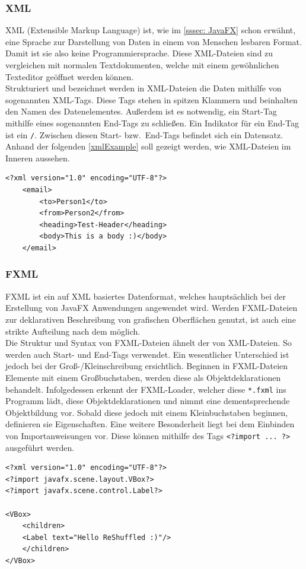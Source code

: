 \subsubsection{XML}
XML (Extensible Markup Language) ist, wie im \autoref{sssec: JavaFX} schon erwähnt, eine Sprache zur Darstellung von Daten in einem von Menschen lesbaren Format.
Damit ist sie also keine Programmiersprache.
Diese XML-Dateien sind zu vergleichen mit normalen Textdokumenten, welche mit einem gewöhnlichen Texteditor geöffnet werden können.\\
Strukturiert und bezeichnet werden in XML-Dateien die Daten mithilfe von sogenannten XML-Tags.
Diese Tags stehen in spitzen Klammern und beinhalten den Namen des Datenelementes.
Außerdem ist es notwendig, ein Start-Tag mithilfe eines sogenannten End-Tags zu schließen.
Ein Indikator für ein End-Tag ist ein \lstinline{/}.
Zwischen diesen Start- bzw.\ End-Tags befindet sich ein Datensatz.\\
Anhand der folgenden \autoref{xmlExample} soll gezeigt werden, wie XML-Dateien im Inneren aussehen.
\begin{lstlisting}[style=XML,caption=XML-Codebeispiel,label=xmlExample]
<?xml version="1.0" encoding="UTF-8"?>
    <email>
        <to>Person1</to>
        <from>Person2</from>
        <heading>Test-Header</heading>
        <body>This is a body :)</body>
    </email>
\end{lstlisting}
\subsubsection{FXML}
FXML ist ein auf XML basiertes Datenformat, welches hauptsächlich bei der Erstellung von JavaFX Anwendungen angewendet wird.
Werden FXML-Dateien zur deklarativen Beschreibung von grafischen Oberflächen genutzt, ist auch eine strikte Aufteilung nach dem  möglich.\\
Die Struktur und Syntax von FXML-Dateien ähnelt der von XML-Dateien.
So werden auch Start- und End-Tags verwendet.
Ein wesentlicher Unterschied ist jedoch bei der Groß-/Kleinschreibung ersichtlich.
Beginnen in FXML-Dateien Elemente mit einem Großbuchstaben, werden diese als Objektdeklarationen behandelt.
Infolgedessen erkennt der FXML-Loader, welcher diese \lstinline{*.fxml} ins Programm lädt, diese Objektdeklarationen und nimmt eine dementsprechende Objektbildung vor.
Sobald diese jedoch mit einem Kleinbuchstaben beginnen, definieren sie Eigenschaften.
Eine weitere Besonderheit liegt bei dem Einbinden von Importanweisungen vor.
Diese können mithilfe des Tags \lstinline{<?import ... ?>} ausgeführt werden.
\begin{lstlisting}[style=XML,caption=FXML-Codebeispiel,label=fxmlExample]
<?xml version="1.0" encoding="UTF-8"?>
<?import javafx.scene.layout.VBox?>
<?import javafx.scene.control.Label?>

<VBox>
    <children>
    <Label text="Hello ReShuffled :)"/>
    </children>
</VBox>
\end{lstlisting}
